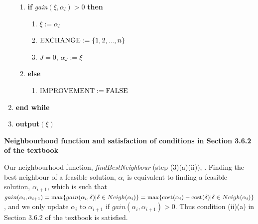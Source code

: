 \documentclass[12pt,a4paper,reqno]{article}
\begin{document}
\begin{enumerate}
\begin{enumerate}
\item \textbf{if} \textit{gain}$(\xi,\alpha_l) > 0$ \textbf{then}
\begin{enumerate}
\item[] $\xi:=\alpha_l$
\item[] $\textnormal{EXCHANGE} := \{1,2,...,n\}$
\item[] \color{red} $J=0$, $\alpha_J := \xi$ \color{black}
\end{enumerate}
\item[] \textbf{else}
\begin{enumerate}
\item[] $\textnormal{IMPROVEMENT} := \textnormal{FALSE}$
\end{enumerate}
\end{enumerate}
\item[] \textbf{end while}
\item \textbf{output}$(\xi)$
\end{enumerate}

\textbf{Neighbourhood function and satisfaction of conditions in Section 3.6.2 of the textbook}

Our neighbourhood function, \textit{findBestNeighbour} (step (3)(a)(ii)), . Finding the best neighbour of a feasible solution, $\alpha_i$ is equivalent to finding a feasible solution, $\alpha_{i+1}$, which is such that $gain(\alpha_i,\alpha_{i+1})=\max\{gain(\alpha_i,\delta) | \delta\in Neigh(\alpha_i)\} = \max\{\textnormal{cost}(\alpha_i) - \textnormal{cost}(\delta) | \delta\in Neigh(\alpha_i)\}$, and we only update $\alpha_i$ to $\alpha_{i+1}$ if $gain(\alpha_i,\alpha_{i+1}) > 0$. Thus condition (ii)(a) in Section 3.6.2 of the textbook is satisfied.\\
\end{document}
